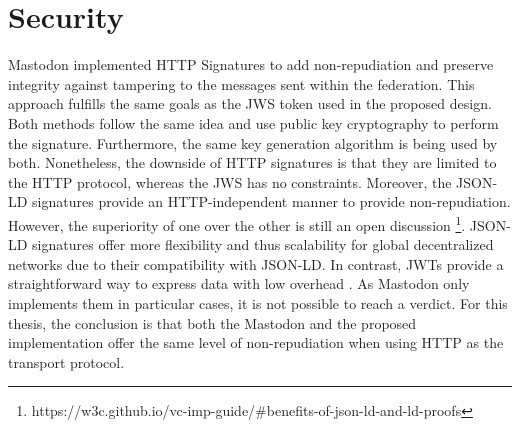 \section{Security}
Mastodon implemented HTTP Signatures to add non-repudiation and preserve integrity against tampering to the messages sent within the federation. This approach fulfills the same goals as the JWS token used in the proposed design. Both methods follow the same idea and use public key cryptography to perform the signature. Furthermore, the same key generation algorithm is being used by both. Nonetheless, the downside of HTTP signatures is that they are limited to the HTTP protocol, whereas the JWS has no constraints. 
Moreover, the JSON-LD signatures provide an HTTP-independent manner to provide non-repudiation. However, the superiority of one over the other is still an open discussion \footnote{https://w3c.github.io/vc-imp-guide/\#benefits-of-json-ld-and-ld-proofs}. JSON-LD signatures offer more flexibility and thus scalability for global decentralized networks due to their compatibility with JSON-LD. In contrast, JWTs provide a straightforward way to express data with low overhead \cite{chadwick_longley_sporny_terbu_zagidulin_zundel_2022}. As Mastodon only implements them in particular cases, it is not possible to reach a verdict. 
For this thesis, the conclusion is that both the Mastodon and the proposed implementation offer the same level of non-repudiation when using HTTP as the transport protocol. 

